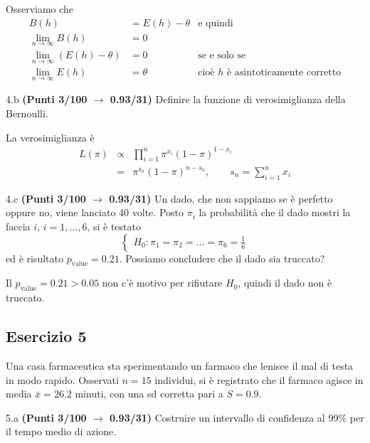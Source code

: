\documentclass[
  11pt,
]{book}
\theoremstyle{mytheoremstyle}
\theoremstyle{mydefstyle}
\newenvironment{sol}
  {
  \begin{tcolorbox}[enhanced,breakable,arc=0.1mm,boxrule=1pt,colback=white,colframe=iblue,
  title=\bf \fontfamily{lmss}\selectfont \hspace{.5 cm} Soluzione,drop fuzzy shadow]

}{
\end{tcolorbox}
  }
\begin{document}
\begin{sol}
Osserviamo che
\begin{align*}
B(h) &= E(h)-\theta&\text{e quindi}\\
\lim_{n\to\infty}B(h)&=0\\
\lim_{n\to\infty}(E(h)-\theta)&=0 &\text{se e solo se}\\
\lim_{n\to\infty}E(h)&=\theta &\text{cioè $h$ è asintoticamente corretto}
\end{align*}

\end{sol}

4.b \textbf{(Punti 3/100 \(\rightarrow\) 0.93/31)} Definire la funzione di verosimiglianza della Bernoulli.

\begin{sol}
La verosimiglianza è
\begin{eqnarray*}
L(\pi)     &\propto& \prod_{i=1}^n \pi^{x_i}(1-\pi)^{1-x_i}\\
           &=& \pi^{s_n}(1-\pi)^{n-s_n}, \qquad s_n=\sum_{i=1}^n x_i
\end{eqnarray*}

\end{sol}

4.c \textbf{(Punti 3/100 \(\rightarrow\) 0.93/31)} Un dado, che non sappiamo se è perfetto oppure no, viene lanciato 40 volte.
Posto \(\pi_i\) la probabilità che il dado mostri la faccia \(i\), \(i=1,...,6\), si è testato
\[
\begin{cases}
H_0:\pi_1=\pi_2=...=\pi_6=\frac 16
\end{cases}
\]
ed è risultato \(p_\text{value}=0.21\). Possiamo concludere che il dado sia truccato?

\begin{sol}
Il \(p_\text{value}=0.21>0.05\) non c'è motivo per rifiutare \(H_0\), quindi il dado non è truccato.

\end{sol}

\subsection{Esercizio 5}\label{esercizio-5-5}

Una casa farmaceutica sta sperimentando un farmaco che lenisce il mal di testa in modo rapido. Osservati \(n=15\) individui, si è registrato che il farmaco agisce in media \(\bar x=26.2\) minuti, con una sd corretta pari a
\(S=0.9\).

5.a \textbf{(Punti 3/100 \(\rightarrow\) 0.93/31)} Costruire un intervallo di confidenza al 99\% per il tempo medio di azione.
\end{document}
